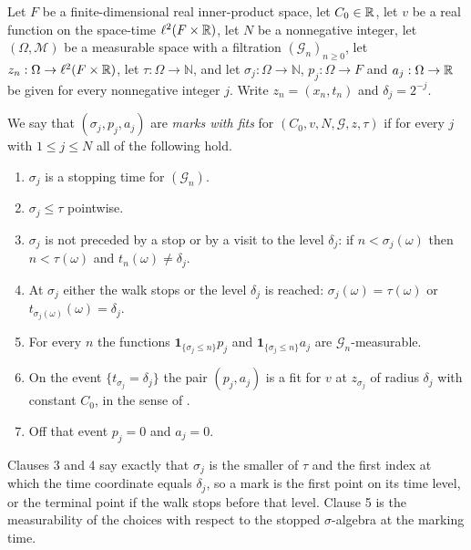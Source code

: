 \begin{definition}
Let $F$ be a finite-dimensional real inner-product space, let $C_0\in\mathbb{R}$, let
$v$ be a real function on the space-time $\ell^2(F\times\mathbb{R})$, let $N$ be a
nonnegative integer, let $(\Omega,\mathcal M)$ be a measurable space with a
filtration $(\mathcal G_n)_{n\ge0}$, let $z_n:\Omega\to\ell^2(F\times\mathbb{R})$, let
$\tau:\Omega\to\mathbb N$, and let $\sigma_j:\Omega\to\mathbb N$,
$p_j:\Omega\to F$ and $a_j:\Omega\to\mathbb{R}$ be given for every nonnegative integer
$j$. Write $z_n=(x_n,t_n)$ and $\delta_j=2^{-j}$.

We say that $(\sigma_j,p_j,a_j)$ are \emph{marks with fits} for
$(C_0,v,N,\mathcal G,z,\tau)$ if for every $j$ with $1\le j\le N$ all of the
following hold.
\begin{enumerate}
\item $\sigma_j$ is a stopping time for $(\mathcal G_n)$.
\item $\sigma_j\le\tau$ pointwise.
\item $\sigma_j$ is not preceded by a stop or by a visit to the level
$\delta_j$: if $n<\sigma_j(\omega)$ then $n<\tau(\omega)$ and
$t_n(\omega)\ne\delta_j$.
\item At $\sigma_j$ either the walk stops or the level $\delta_j$ is reached:
$\sigma_j(\omega)=\tau(\omega)$ or $t_{\sigma_j(\omega)}(\omega)=\delta_j$.
\item For every $n$ the functions $\mathbf1_{\{\sigma_j\le n\}}p_j$ and
$\mathbf1_{\{\sigma_j\le n\}}a_j$ are $\mathcal G_n$-measurable.
\item On the event $\{t_{\sigma_j}=\delta_j\}$ the pair $(p_j,a_j)$ is a fit for
$v$ at $z_{\sigma_j}$ of radius $\delta_j$ with constant $C_0$, in the sense of
.
\item Off that event $p_j=0$ and $a_j=0$.
\end{enumerate}
Clauses 3 and 4 say exactly that $\sigma_j$ is the smaller of $\tau$ and the
first index at which the time coordinate equals $\delta_j$, so a mark is the
first point on its time level, or the terminal point if the walk stops before
that level. Clause 5 is the measurability of the choices with respect to the
stopped $\sigma$-algebra at the marking time.
\end{definition}
